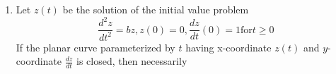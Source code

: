 \documentclass[journal]{IEEEtran}
\begin{document}
\begin{enumerate}
\begin{enumerate}
		\end{enumerate}
	\item Let $z(t)$ be the solution of the initial value problem
		$$ \frac{d^2z}{dt^2} = bz, z(0) = 0, \frac{dz}{dt} (0) = 1 \text{for} t \geq 0 $$
		If the planar curve parameterized by $t$ having x-coordinate $z(t)$ and $y$-coordinate $\frac{dz}{dt}$ is closed, then necessarily
		\begin{enumerate}
		\end{enumerate}
			
\end{enumerate}
\end{document}
